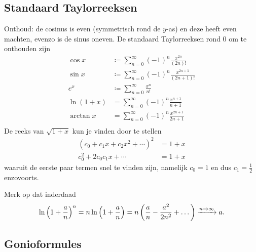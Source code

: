 \subsection{Standaard Taylorreeksen}\label{subsec:standaardTaylorreeksen}
Onthoud: de cosinus is even (symmetrisch rond de $y$-as) en deze heeft even machten, evenzo is de sinus oneven.
De standaard Taylorreeksen rond 0 om te onthouden zijn
\begin{align*}
    \cos x &\coloneqq \sum_{n=0}^\infty (-1)^n \frac{x^{2n}}{(2n)!} \\
    \sin x &\coloneqq \sum_{n=0}^\infty (-1)^n \frac{x^{2n+1}}{(2n+1)!} \\
    e^x &\coloneqq \sum_{n=0}^\infty \frac{x^n}{n!} \\
    \ln (1+x) &= \sum_{n=0}^\infty (-1)^{n} \frac{x^{n+1}}{n+1} \\
    \arctan x &= \sum_{n=0}^\infty (-1)^n \frac{x^{2n+1}}{2n+1} \\
\end{align*}
De reeks van $\sqrt{1+x}$ kun je vinden door te stellen
\begin{align*}
    \left( c_0 + c_1 x + c_2 x^2 + \dotsm \right)^2 &= 1+x \\
    c_0^2 + 2 c_0 c_1 x + \dotsm &= 1+x
\end{align*}
waaruit de eerste paar termen snel te vinden zijn, namelijk $c_0=1$ en dus $c_1 = \frac 1 2$ enzovoorts.

Merk op dat inderdaad
\[
    \ln \left(1 + \frac a n \right)^n = n \ln \left(1 + \frac a n \right) = n \left(\frac a n - \frac{a^2}{2n^2} + \dots \right) \xrightarrow{n \to \infty} a.
\]
\subsection{Gonioformules} \label{gonioformules}
